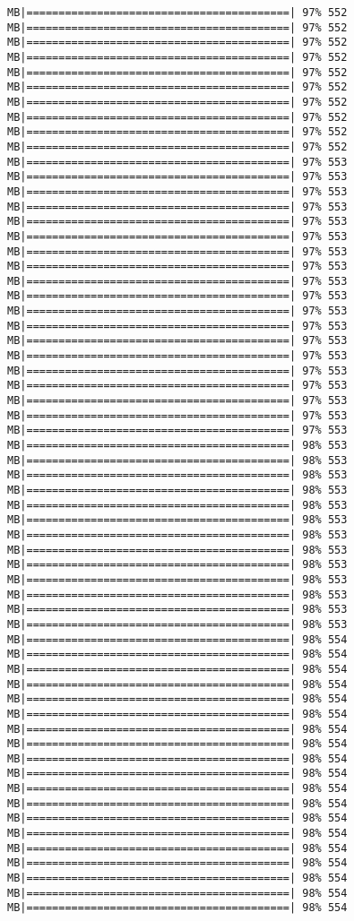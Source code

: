 \documentclass[
]{article}
\begin{document}
\begin{verbatim}
MB|=========================================| 97% 552 MB|=========================================| 97% 552 MB|=========================================| 97% 552 MB|=========================================| 97% 552 MB|=========================================| 97% 552 MB|=========================================| 97% 552 MB|=========================================| 97% 552 MB|=========================================| 97% 552 MB|=========================================| 97% 552 MB|=========================================| 97% 552 MB|=========================================| 97% 553 MB|=========================================| 97% 553 MB|=========================================| 97% 553 MB|=========================================| 97% 553 MB|=========================================| 97% 553 MB|=========================================| 97% 553 MB|=========================================| 97% 553 MB|=========================================| 97% 553 MB|=========================================| 97% 553 MB|=========================================| 97% 553 MB|=========================================| 97% 553 MB|=========================================| 97% 553 MB|=========================================| 97% 553 MB|=========================================| 97% 553 MB|=========================================| 97% 553 MB|=========================================| 97% 553 MB|=========================================| 97% 553 MB|=========================================| 97% 553 MB|=========================================| 97% 553 MB|=========================================| 98% 553 MB|=========================================| 98% 553 MB|=========================================| 98% 553 MB|=========================================| 98% 553 MB|=========================================| 98% 553 MB|=========================================| 98% 553 MB|=========================================| 98% 553 MB|=========================================| 98% 553 MB|=========================================| 98% 553 MB|=========================================| 98% 553 MB|=========================================| 98% 553 MB|=========================================| 98% 553 MB|=========================================| 98% 553 MB|=========================================| 98% 554 MB|=========================================| 98% 554 MB|=========================================| 98% 554 MB|=========================================| 98% 554 MB|=========================================| 98% 554 MB|=========================================| 98% 554 MB|=========================================| 98% 554 MB|=========================================| 98% 554 MB|=========================================| 98% 554 MB|=========================================| 98% 554 MB|=========================================| 98% 554 MB|=========================================| 98% 554 MB|=========================================| 98% 554 MB|=========================================| 98% 554 MB|=========================================| 98% 554 MB|=========================================| 98% 554 MB|=========================================| 98% 554 MB|=========================================| 98% 554 MB|=========================================| 98% 554 
\end{verbatim}
\end{document}
